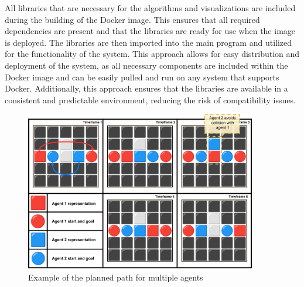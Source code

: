 All libraries that are necessary for the algorithms and visualizations are included during the building of the Docker image. This ensures that all required dependencies are present and that the libraries are ready for use when the image is deployed. The libraries are then imported into the main program and utilized for the functionality of the system. This approach allows for easy distribution and deployment of the system, as all necessary components are included within the Docker image and can be easily pulled and run on any system that supports Docker. Additionally, this approach ensures that the libraries are available in a consistent and predictable environment, reducing the risk of compatibility issues.

\begin{figure}[H]
    \centering
    \includegraphics[width=0.9\textwidth]{pictures/example_planning.png}
    \caption{ Example of the planned path for multiple agents } 
    \label{fig:multiple_agent_path}
\end{figure}